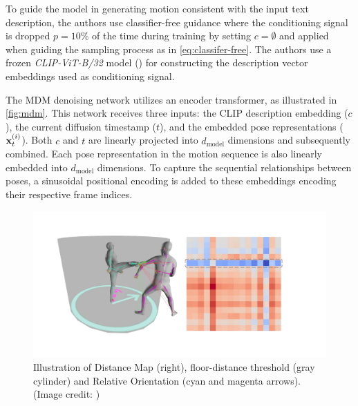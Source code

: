To guide the model in generating motion consistent with the input text description, the authors use classifier-free guidance where the conditioning signal is dropped $p=10\%$ of the time during training by setting $c=\emptyset$ and applied when guiding the sampling process as in \cref{eq:classifer-free}. The authors use a frozen \textit{CLIP-ViT-B/32} model (\cite{radford2021learning}) for constructing the description vector embeddings used as conditioning signal.

The MDM denoising network utilizes an encoder transformer, as illustrated in \cref{fig:mdm}. This network receives three inputs: the CLIP description embedding ($c$), the current diffusion timestamp ($t$), and the embedded pose representations ($\boldsymbol{\mathbf{x}}_t^{(i)}$). Both $c$ and $t$ are linearly projected into $d_\text{model}$ dimensions and subsequently combined. Each pose representation in the motion sequence is also linearly embedded into $d_\text{model}$ dimensions. To capture the sequential relationships between poses, a sinusoidal positional encoding is added to these embeddings encoding their respective frame indices.


\begin{figure}
    \centering
    \includegraphics[width=0.5\linewidth]{figures/intergen-dm-ro.pdf}
    \caption{Illustration of Distance Map (right), floor-distance threshold (gray cylinder) and Relative Orientation (cyan and magenta arrows). (Image credit: \cite{liang2024intergen})}
    \label{fig:intergen-losses}
\end{figure}


